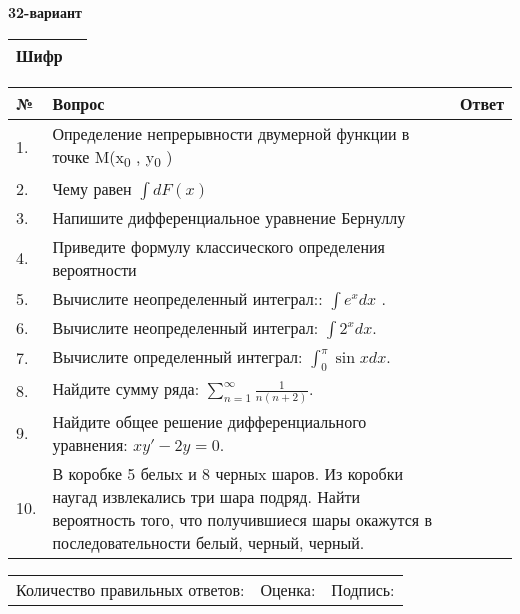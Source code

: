 \documentclass{article}
\begin{document}
  \egroup
  
  \newpage
  
  
  \textbf{32-вариант}\\
  
  \bgroup
  \def\arraystretch{1.6} %
  
  \begin{tabular}{|m{5.7cm}|m{9.5cm}|}
  \hline
  Шифр & \\
  \hline
  \end{tabular}
  
  \vspace{1cm}
  
  \begin{tabular}{|m{0.7cm}|m{10cm}|m{4cm}|}
  \hline
  № & Вопрос & Ответ \\
  \hline
  1. & Определение непрерывности двумерной функции в точке M(x\textsubscript{0} , y\textsubscript{0} ) &  \\
  \hline
  2. & Чему равен \(\int{dF(x)}\) &  \\
  \hline
  3. & Напишите дифференциальное уравнение Бернуллу &  \\
  \hline
  4. & Приведите формулу классического определения вероятности &  \\
  \hline
  5. & Вычислите неопределенный интеграл:: \(\int{e^{x}dx}\) . &  \\
  \hline
  6. & Вычислите неопределенный интеграл: \(\int2^{x}dx\). &  \\
  \hline
  7. & Вычислите определенный интеграл: \(\int_{0}^{\pi}{\sin xdx}\). &  \\
  \hline
  8. & Найдите сумму ряда: \(\sum_{n = 1}^{\infty}\frac{1}{n(n + 2)}\). &  \\
  \hline
  9. & Найдите общее решение дифференциального уравнения: \(xy' - 2y = 0\). &  \\
  \hline
  10. & В коробке 5 белыx и 8 черныx шаров. Из коробки наугад извлекались три шара подряд. Найти вероятность того, что получившиеся шары окажутся в последовательности белый, черный, черный. &  \\
  \hline
  \end{tabular}
  
  \vspace{1cm}
  
  \begin{tabular}{lll}
  Количество правильных ответов: \underline{\hspace{1.5cm}} & 
  Оценка: \underline{\hspace{1.5cm}} & 
  Подпись: \underline{\hspace{2cm}} \\
  \end{tabular}
  
\end{document}
